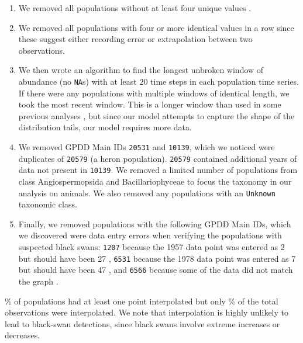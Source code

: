 \documentclass[12pt]{article}
\begin{document}
\begin{enumerate}
\item We removed all populations without at least four unique values
  \cite{brook2006a}.

\item We removed all populations with four or more identical values in a row
  since these suggest either recording error or extrapolation between two
  observations.

\item We then wrote an algorithm to find the longest unbroken window of
  abundance (no \texttt{NA}s) with at least $20$ time steps in each population
  time series. If there were any populations with multiple windows of identical
  length, we took the most recent window. This is a longer window than used in
  some previous analyses \cite{brook2006a}, but since our model
  attempts to capture the shape of the distribution tails, our model requires
  more data.

\item We removed GPDD Main IDs \texttt{20531} and \texttt{10139}, which we
  noticed were duplicates of \texttt{20579} (a heron population).
  \texttt{20579} contained additional years of data not present in
  \texttt{10139}. We removed a limited number of populations from class
  Angiospermopsida and Bacillariophyceae to focus the taxonomy in our analysis
  on animals. We also removed any populations with an \texttt{Unknown}
  taxonomic class.

\item Finally, we removed populations with the following GPDD Main IDs, which
  we discovered were data entry errors when verifying the populations with
  suspected black swans: \texttt{1207} because the 1957 data point was entered
  as 2 but should have been 27 \cite{kendeigh1982}, \texttt{6531} because the
  1978 data point was entered as 7 but should have been 47 \cite{minot1986},
  and \texttt{6566} because some of the data did not match the graph
  \cite{heessen1996}.

\end{enumerate}

\noindent
\percImputedPops\% of populations had at least one point interpolated but
only \percImputedPoints\% of the total observations were interpolated.
We note that interpolation is highly unlikely to lead to
black-swan detections, since black swans involve extreme increases or
decreases.
\end{document}
